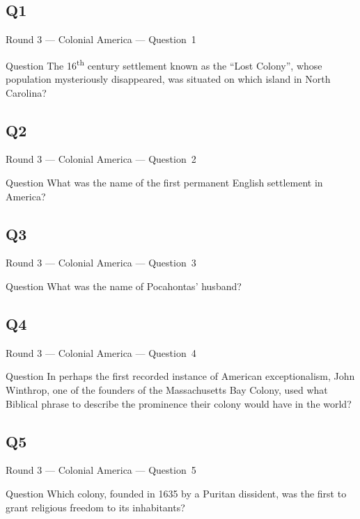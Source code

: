 \documentclass[11pt]{beamer}
\begin{document}
\subsection*{Q1}
\begin{frame}[t]{Round 3 --- Colonial America --- \mbox{Question 1}}
\vspace{-0.5em}
\begin{block}{Question}
The 16\textsuperscript{th} century settlement known as the ``Lost Colony'', whose population mysteriously disappeared, was situated on which island in North Carolina?
\end{block}
\end{frame}
\subsection*{Q2}
\begin{frame}[t]{Round 3 --- Colonial America --- \mbox{Question 2}}
\vspace{-0.5em}
\begin{block}{Question}
What was the name of the first permanent English settlement in America?
\end{block}
\end{frame}
\subsection*{Q3}
\begin{frame}[t]{Round 3 --- Colonial America --- \mbox{Question 3}}
\vspace{-0.5em}
\begin{block}{Question}
What was the name of Pocahontas' husband?
\end{block}
\end{frame}
\subsection*{Q4}
\begin{frame}[t]{Round 3 --- Colonial America --- \mbox{Question 4}}
\vspace{-0.5em}
\begin{block}{Question}
In perhaps the first recorded instance of American exceptionalism, John Winthrop, one of the founders of the Massachusetts Bay Colony, used what Biblical phrase to describe the prominence their colony would have in the world?
\end{block}
\end{frame}
\subsection*{Q5}
\begin{frame}[t]{Round 3 --- Colonial America --- \mbox{Question 5}}
\vspace{-0.5em}
\begin{block}{Question}
Which colony, founded in 1635 by a Puritan dissident, was the first to grant religious freedom to its inhabitants?
\end{block}
\end{frame}
\end{document}
